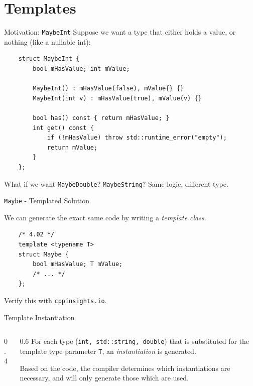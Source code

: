 \section{Templates}

\begin{frame}[fragile]{Motivation: \texttt{MaybeInt}}
  Suppose we want a type that either holds a value, or nothing (like a nullable int):
  \begin{verbatim}
    struct MaybeInt {
        bool mHasValue; int mValue;

        MaybeInt() : mHasValue(false), mValue{} {}
        MaybeInt(int v) : mHasValue(true), mValue(v) {}

        bool has() const { return mHasValue; }
        int get() const {
            if (!mHasValue) throw std::runtime_error("empty");
            return mValue;
        }
    };
  \end{verbatim}
  What if we want \texttt{MaybeDouble}? \texttt{MaybeString}? Same logic, different type.
\end{frame}

\begin{frame}[fragile]{\texttt{Maybe} - Templated Solution}
  \begin{sqt:result}
    We can generate the exact same code by writing a \emph{template class}.
  \end{sqt:result}

  \begin{verbatim}
    /* 4.02 */
    template <typename T>
    struct Maybe {
        bool mHasValue; T mValue;
        /* ... */
    };
  \end{verbatim}

  Verify this with \verb|cppinsights.io|. \\
\end{frame}

\begin{frame}[fragile]{Template Instantiation}
  \begin{columns}[T]
    \begin{column}{0.4\textwidth}
      
    \end{column}
    \begin{column}{0.6\textwidth}
      \vspace{1cm}
      For each type (\texttt{int, std::string, double}) that is substituted for
      the template type parameter \texttt{T}, 
      an \emph{instantiation} is generated.

      Based on the code, the compiler determines which instantiations are necessary,
      and will only generate those which are used.
    \end{column}
  \end{columns}
\end{frame}

